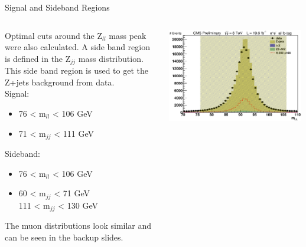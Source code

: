 \begin{frame}{Signal and Sideband Regions}
  \begin{columns}
    \begin{column}{0.6\textwidth}
\footnotesize
\scriptsize
Optimal cuts around the Z$_{ll}$ mass peak were also calculated. A side band region is defined in the Z$_{jj}$ mass distribution.  This side band region is used to get the Z+jets background from data.
\\
\footnotesize
\vspace{1em}
      Signal:
      \begin{itemize}
      \item
        76 < m$_{ll}$ < 106 GeV
      \item
        71 < m$_{jj}$ < 111 GeV
      \end{itemize}
      Sideband:
      \begin{itemize}
      \item
        76 < m$_{ll}$ < 106 GeV
      \item
        60 < m$_{jj}$ < 71 GeV\\
        111 < m$_{jj}$ < 130 GeV
      \end{itemize}
\vspace{2em}
\scriptsize
The muon distributions look similar and can be seen in the backup slides.
    \end{column}
    \begin{column}{0.4\textwidth}
      \includegraphics[width=0.99\textwidth]{images/mLL_signal_sideband.eps}\\

\end{column}
\end{columns}
\end{frame}
